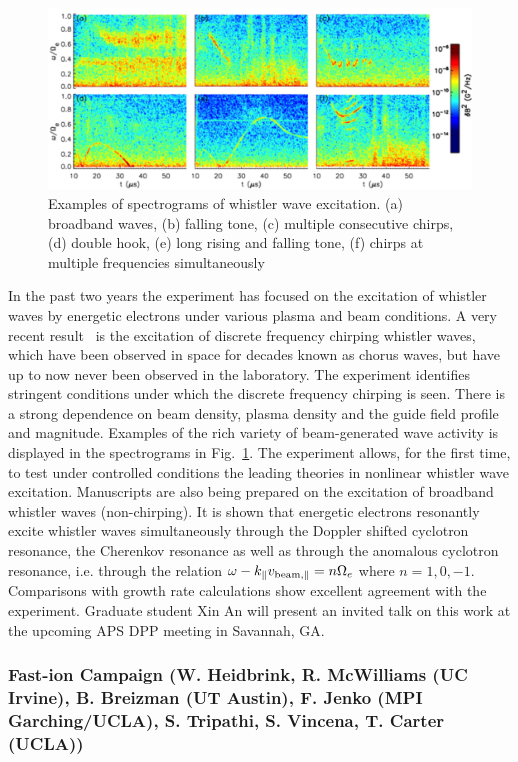 \documentclass[11pt]{article}
\renewcommand{\cite}{\citep}
\begin{document}
\begin{figure}[!htbp]
\centerline{\includegraphics[width=5.6truein]{bortnik1}}
\caption{Examples of spectrograms of whistler wave excitation. (a)
  broadband waves, (b) falling tone, (c) multiple consecutive chirps,
  (d) double hook, (e) long rising and falling tone, (f) chirps at
  multiple frequencies simultaneously}\label{bortnik1}
\end{figure}


In the past two years the experiment has focused on the excitation of
whistler waves by energetic electrons under various plasma and beam
conditions. A very recent result~\cite{vancompernolle:2015a} is the excitation
of discrete frequency chirping whistler waves, which have been observed
in space for decades known as chorus waves, but have up to now never
been observed in the laboratory. The experiment identifies stringent
conditions under which the discrete frequency chirping is seen. There is
a strong dependence on beam density, plasma density and the guide field
profile and magnitude. Examples of the rich variety of beam-generated
wave activity is displayed in the spectrograms in Fig.~\ref{bortnik1}. The
experiment allows, for the first time, to test under controlled
conditions the leading theories in nonlinear whistler wave excitation.
Manuscripts are also being prepared on the excitation of broadband
whistler waves (non-chirping). It is shown that energetic electrons
resonantly excite whistler waves simultaneously through the Doppler
shifted cyclotron resonance, the Cherenkov resonance as well as through
the anomalous cyclotron resonance, i.e. through the relation $\omega -
k_\parallel v_{{\rm beam}, \parallel} = n\Omega_{e}$ where
$n=1,0,-1$. Comparisons with
growth rate calculations show excellent agreement with the
experiment.  Graduate student Xin An will present an invited talk on
this work at the upcoming APS DPP meeting in Savannah, GA.

\subsubsection{Fast-ion Campaign (W. Heidbrink, R. McWilliams (UC Irvine), B.
Breizman (UT Austin), F. Jenko (MPI Garching/UCLA), S. Tripathi, S.
Vincena, T. Carter (UCLA))}
\end{document}
